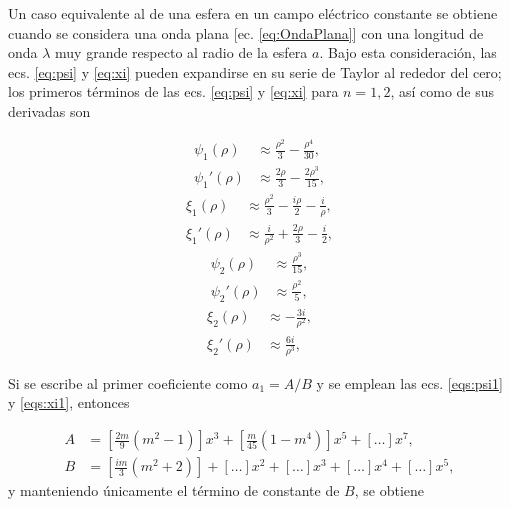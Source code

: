 \documentclass[letterpaper, 12pt] {article}
\begin{document}
Un caso equivalente al de una esfera en un campo eléctrico constante se obtiene cuando se considera una onda plana  [ec. \eqref{eq:OndaPlana}]  con una longitud de onda $\lambda$ muy grande respecto al radio de la esfera $a$. Bajo esta consideración, las ecs. \eqref{eq:psi} y \eqref{eq:xi} pueden expandirse en su serie de Taylor al rededor del cero; los primeros términos de las ecs. \eqref{eq:psi} y \eqref{eq:xi} para $n=1,2$, así como de sus derivadas son 
\begin{multicols}{2}
	\begin{subequations}
	\begin{align}
	\psi_1 (\rho)&\approx \frac{\rho ^2}{3}-\frac{\rho ^4}{30},\label{eq:psi1}\\
	\psi_1'(\rho) &\approx\frac{2 \rho }{3}-\frac{2 \rho ^3}{15},\label{eq:psi1'}
	\end{align}\label{eqs:psi1}
	\end{subequations}
\begin{subequations}
\begin{align}
\xi_1 (\rho)&\approx \frac{\rho ^2}{3}-\frac{i \rho }{2}-\frac{i}{\rho } ,\label{eq:xi1}\\
\xi_1'(\rho) &\approx\frac{i}{\rho ^2}+\frac{2 \rho }{3}-\frac{i}{2},\label{eq:xi1'}
\end{align}\label{eqs:xi1}
\end{subequations} 
	\begin{subequations}
	\begin{align}
	\psi_2 (\rho)&\approx \frac{\rho ^3}{15},\label{eq:psi2}\\
	\psi_2'(\rho) &\approx\frac{\rho ^2}{5},\label{eq:psi2'}
	\end{align}\label{eqs:psi2}
	\end{subequations}
\begin{subequations}
\begin{align}
\xi_2 (\rho)&\approx -\frac{3 i}{\rho ^2},\label{eq:xi2} \\
\xi_2' (\rho) &\approx \frac{6 i}{\rho ^3},\label{eq:xi2'}
\end{align}\label{eqs:xi2}
\end{subequations}
\end{multicols}

Si se escribe al primer coeficiente como $a_1 = A/B$ y se emplean las ecs. \eqref{eqs:psi1} y \eqref{eqs:xi1}, entonces

\begin{align}
A &= \left[\frac{2m}{9}(m^2-1) \right] x^3 + \left[\frac{m}{45}(1-m^4) \right] x^5 +  \left[\ldots \right] x^7, \\
B &= \left[\frac{im}{3}(m^2+2) \right]+ \left[\ldots \right] x^2 +  \left[\ldots \right] x^3 + \left[\ldots \right]x^4 + \left[\ldots \right]x^5,
\end{align}
y manteniendo únicamente el término de constante de $B$, se obtiene
\end{document}
